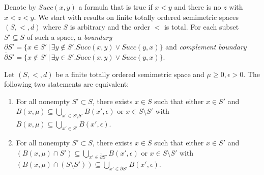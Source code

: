 Denote by $Succ(x,y)$ a formula that is true if $x < y$ and there is no $z$ with $x < z < y$. We start with results on finite totally ordered semimetric spaces $(S, <, d)$ where $S$ is arbitrary and the order $<$ is total. For each subset $S' \subseteq S$ of such a space, a \emph{boundary} $\partial S' = \{x \in S' \,|\, \exists y \not\in S' . Succ(x,y) \vee Succ(y,x)\}$ and \emph{complement boundary} $\overline\partial S' = \{x \not\in S' \,|\, \exists y \in S' . Succ(x,y) \vee Succ(y,x)\}$.


\begin{theorem}
\label{thm:existence-total}
    Let $(S, <, d)$ be a finite totally ordered semimetric space and $\mu \geq 0, \epsilon > 0$. The following two statements are equivalent:
    \begin{enumerate}
        \item For all nonempty $S' \subset S$, there exists $x \in S$ such that either $x \in S'$ and $B(x,\mu) \subseteq \bigcup_{x' \in S \setminus S'} B(x', \epsilon)$ or $x \in S \setminus S'$ with $B(x,\mu) \subseteq \bigcup_{x' \in S'} B(x', \epsilon)$.
        \item For all nonempty $S' \subset S$, there exists $x \in S$ such that either $x \in S'$ and $(B(x,\mu) \cap S') \subseteq \bigcup_{x' \in \overline{\partial}S'} B(x', \epsilon)$ or $x \in S \setminus S'$ with $(B(x,\mu) \cap (S \setminus S')) \subseteq \bigcup_{x' \in \partial S'} B(x', \epsilon)$.
    \end{enumerate}
\end{theorem}

